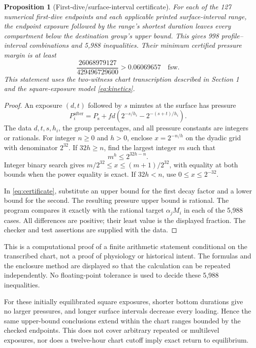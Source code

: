 \documentclass[11pt,letterpaper]{article}
\newtheorem{proposition}{Proposition}
\newcommand{\Ps}{P_{\mathrm{s}}}
\begin{document}
\begin{proposition}[First-dive/surface-interval certificate]\label{prop:certificate}
For each of the 127 numerical first-dive endpoints and each applicable printed surface-interval range, the endpoint exposure followed by the range's shortest duration leaves every compartment below the destination group's upper bound. This gives 998 profile--interval combinations and 5,988 inequalities. Their minimum certified pressure margin is at least
\[
\frac{26068979127}{429496729600}
>0.06069657\quad\text{fsw}.
\]
This statement uses the two-witness chart transcription described in Section 1 and the square-exposure model \eqref{eq:kinetics}.
\end{proposition}
\begin{proof}
An exposure $(d,t)$ followed by $s$ minutes at the surface has pressure
\begin{equation}
P_i^{\mathrm{after}}=\Ps+fd\left(2^{-s/h_i}-2^{-(s+t)/h_i}\right).
\label{eq:certificate}
\end{equation}
The data $d,t,s,h_i$, the group percentages, and all pressure constants are integers or rationals. For integer $n\ge0$ and $h>0$, enclose $x=2^{-n/h}$ on the dyadic grid with denominator $2^{32}$. If $32h\ge n$, find the largest integer $m$ such that
\[
m^h\le 2^{32h-n}.
\]
Integer binary search gives $m/2^{32}\le x\le(m+1)/2^{32}$, with equality at both bounds when the power equality is exact. If $32h<n$, use $0\le x\le2^{-32}$.

In \eqref{eq:certificate}, substitute an upper bound for the first decay factor and a lower bound for the second. The resulting pressure upper bound is rational. The program compares it exactly with the rational target $\alpha_jM_i$ in each of the 5,988 cases. All differences are positive; their least value is the displayed fraction. The checker and test assertions are supplied with the data.
\end{proof}

This is a computational proof of a finite arithmetic statement conditional on the transcribed chart, not a proof of physiology or historical intent. The formulas and the enclosure method are displayed so that the calculation can be repeated independently. No floating-point tolerance is used to decide these 5,988 inequalities.

For these initially equilibrated square exposures, shorter bottom durations give no larger pressures, and longer surface intervals decrease every loading. Hence the same upper-bound conclusions extend within the chart ranges bounded by the checked endpoints. This does not cover arbitrary repeated or multilevel exposures, nor does a twelve-hour chart cutoff imply exact return to equilibrium.
\end{document}
